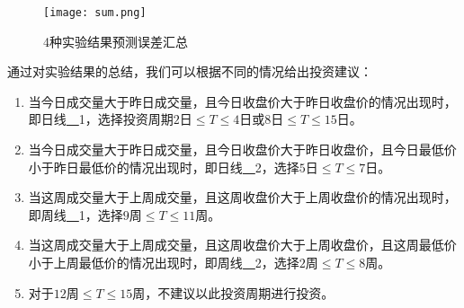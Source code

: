 \begin{figure}[ht]
    \centering
    \caption{4种实验结果预测误差汇总}
    \texttt{[image: sum.png]}
\end{figure}

通过对实验结果的总结，我们可以根据不同的情况给出投资建议：
\begin{enumerate}
    \item 当今日成交量大于昨日成交量，且今日收盘价大于昨日收盘价的情况出现时，即日线\underline{~~}1，选择投资周期$2\text{日}\leq T\leq4\text{日}$或$8\text{日}\leq T\leq15\text{日}$。
    \item 当今日成交量大于昨日成交量，且今日收盘价大于昨日收盘价，且今日最低价小于昨日最低价的情况出现时，即日线\underline{~~}2，选择$5\text{日}\leq T\leq7\text{日}$。
    \item 当这周成交量大于上周成交量，且这周收盘价大于上周收盘价的情况出现时，即周线\underline{~~}1，选择$9\text{周}\leq T\leq11\text{周}$。
    \item 当这周成交量大于上周成交量，且这周收盘价大于上周收盘价，且这周最低价小于上周最低价的情况出现时，即周线\underline{~~}2，选择$2\text{周}\leq T\leq8\text{周}$。
    \item 对于$12\text{周}\leq T\leq15\text{周}$，不建议以此投资周期进行投资。
\end{enumerate}